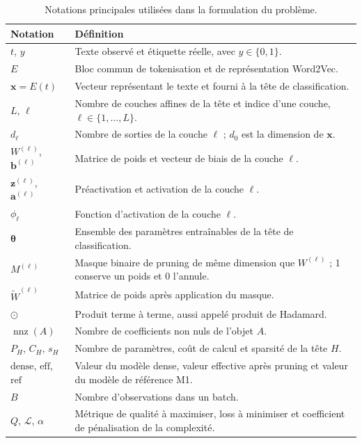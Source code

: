 \begin{table}[!ht]
    \centering
    \begin{tabularx}{\textwidth}{|l|X|}
        \hline
        Notation & Définition \\ \hline
        $t$, $y$ & Texte observé et étiquette réelle, avec $y\in\{0,1\}$. \\ \hline
        $E$ & Bloc commun de tokenisation et de représentation Word2Vec. \\ \hline
        $\boldsymbol{x}=E(t)$ & Vecteur représentant le texte et fourni à la tête de classification. \\ \hline
        $L$, $\ell$ & Nombre de couches affines de la tête et indice d'une couche, $\ell\in\{1,\ldots,L\}$. \\ \hline
        $d_{\ell}$ & Nombre de sorties de la couche $\ell$ ; $d_0$ est la dimension de $\boldsymbol{x}$. \\ \hline
        $W^{(\ell)}$, $\boldsymbol{b}^{(\ell)}$ & Matrice de poids et vecteur de biais de la couche $\ell$. \\ \hline
        $\boldsymbol{z}^{(\ell)}$, $\boldsymbol{a}^{(\ell)}$ & Préactivation et activation de la couche $\ell$. \\ \hline
        $\phi_{\ell}$ & Fonction d'activation de la couche $\ell$. \\ \hline
        $\boldsymbol{\theta}$ & Ensemble des paramètres entraînables de la tête de classification. \\ \hline
        $M^{(\ell)}$ & Masque binaire de pruning de même dimension que $W^{(\ell)}$ ; 1 conserve un poids et 0 l'annule. \\ \hline
        $\widetilde{W}^{(\ell)}$ & Matrice de poids après application du masque. \\ \hline
        $\odot$ & Produit terme à terme, aussi appelé produit de Hadamard. \\ \hline
        $\operatorname{nnz}(A)$ & Nombre de coefficients non nuls de l'objet $A$. \\ \hline
        $P_H$, $C_H$, $s_H$ & Nombre de paramètres, coût de calcul et sparsité de la tête $H$. \\ \hline
        $\mathrm{dense}$, $\mathrm{eff}$, $\mathrm{ref}$ & Valeur du modèle dense, valeur effective après pruning et valeur du modèle de référence M1. \\ \hline
        $B$ & Nombre d'observations dans un batch. \\ \hline
        $Q$, $\mathcal{L}$, $\alpha$ & Métrique de qualité à maximiser, loss à minimiser et coefficient de pénalisation de la complexité. \\ \hline
    \end{tabularx}
    \caption{Notations principales utilisées dans la formulation du problème.}
    \label{tab:notations_probleme}
\end{table}

